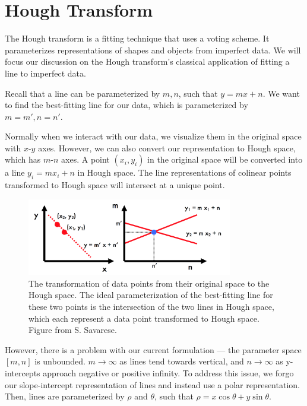 \documentclass[a4paper, 12pt]{article}
\begin{document}
\section{Hough Transform}

The Hough transform is a fitting technique that uses a voting scheme.  It parameterizes representations of shapes and objects from imperfect data.  We will focus our discussion on the Hough transform's classical application of fitting a line to imperfect data.

Recall that a line can be parameterized by $m, n$, such that $y = mx + n$.  We want to find the best-fitting line for our data, which is parameterized by $m = m', n = n'$.

Normally when we interact with our data, we visualize them in the original space with $x$-$y$ axes.  However, we can also convert our representation to Hough space, which has $m$-$n$ axes.  A point $(x_i, y_i)$ in the original space will be converted into a line $y_i = m x_i + n$ in Hough space.  The line representations of colinear points transformed to Hough space will intersect at a unique point.  

\begin{figure}[h!]
\centering
\includegraphics[width=0.8\textwidth]{figures/hough}
\caption{The transformation of data points from their original space to the Hough space.  The ideal parameterization of the best-fitting line for these two points is the intersection of the two lines in Hough space, which each represent a data point transformed to Hough space.  Figure from S. Savarese.}
\end{figure}

However, there is a problem with our current formulation --- the parameter space $[m, n]$ is unbounded.  $m \rightarrow \infty$ as lines tend towards vertical, and $n \rightarrow \infty$ as y-intercepts approach negative or positive infinity.  To address this issue, we forgo our slope-intercept representation of lines and instead use a polar representation.  Then, lines are parameterized by $\rho$ and $\theta$, such that $
\rho = x \cos \theta + y \sin \theta$.
\end{document}
